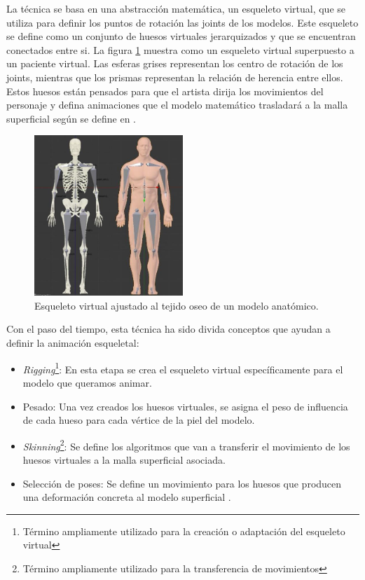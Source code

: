 La técnica se basa en una abstracción matemática, un esqueleto virtual, que se utiliza para definir los puntos de rotación las \ac{joints} de los modelos. Este esqueleto se define como un conjunto de huesos virtuales jerarquizados y que se encuentran conectados entre si. La figura \ref{fig:virtualskeleton} muestra como un esqueleto virtual superpuesto a un paciente virtual. Las esferas grises representan los centro de rotación de los \ac{joints}, mientras que los prismas representan la relación de herencia entre ellos. Estos huesos están pensados para que el artista dirija los movimientos del personaje y defina animaciones que el modelo matemático trasladará a la malla superficial según se define en \cite{thalmann88}. 

\begin{figure}[h]
   \centering
    \includegraphics[width=0.5\textwidth]{IMG/virtualskeleton.png}
    \caption{Esqueleto virtual ajustado al tejido oseo de un modelo anatómico.}
   \label{fig:virtualskeleton}
\end{figure}

Con el paso del tiempo, esta técnica ha sido divida conceptos que ayudan a definir la animación esqueletal:

\begin{itemize}
    \item \emph{Rigging}\footnote{Término ampliamente utilizado para la creación o adaptación del esqueleto virtual}: En esta etapa se crea el esqueleto virtual específicamente para el modelo que queramos animar.
    \item Pesado: Una vez creados los huesos virtuales, se asigna el peso de influencia de cada hueso para cada vértice de la piel del modelo.
    \item \emph{Skinning}\footnote{Término ampliamente utilizado  para la transferencia de movimientos}: Se define los algoritmos que van a transferir el movimiento de los huesos virtuales a la malla superficial asociada. 
    \item Selección de poses: Se define un movimiento para los huesos que producen una deformación concreta al modelo superficial .
\end{itemize}

